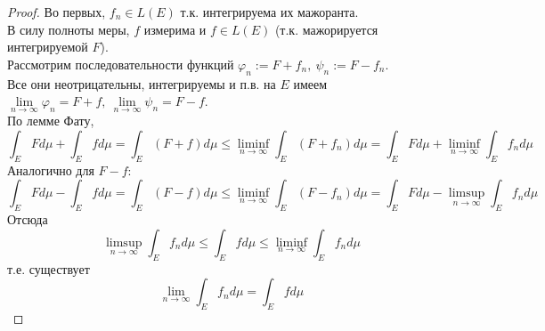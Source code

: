 \documentclass[11pt,a4paper]{report}
\theoremstyle{definition}
\theoremstyle{definition}
\theoremstyle{definition}
\begin{document}
	\begin{proof}
		Во первых, $ f_{n} \in L(E) $ т.к. интегрируема их мажоранта.\\
		В силу полноты меры, $ f $ измерима и $ f \in L(E) $ (т.к. мажорируется интегрируемой $ F $).\\
		Рассмотрим последовательности функций $ \varphi_{n} := F + f_{n},\ \psi_{n} := F - f_{n} $.\\
		Все они неотрицательны, интегрируемы и п.в. на $ E $ имеем $ \lim\limits_{n\to\infty} \varphi_{n} = F + f,\ \lim\limits_{n\to\infty} \psi_{n} = F - f $.\\
		По лемме Фату,
		\[  
			\int_{E} F d\mu + \int_{E} f d\mu = \int_{E} (F + f) d\mu \le \liminf\limits_{n\to\infty}\int_{E}(F + f_{n}) d\mu = \int_{E} F d\mu + \liminf\limits_{n\to\infty} \int_{E} f_{n} d\mu 
		\]
		Аналогично для $ F - f $:
		\[  
			\int_{E} F d\mu - \int_{E} f d\mu = \int_{E} (F - f) d\mu \le \liminf\limits_{n\to\infty}\int_{E}(F - f_{n}) d\mu = \int_{E} F d\mu - \limsup\limits_{n\to\infty} \int_{E} f_{n} d\mu 
		\]
		Отсюда
		\[
			\limsup\limits_{n\to\infty} \int_{E} f_{n} d\mu \le \int_{E} f d\mu \le \liminf_{n\to\infty} \int_{E} f_{n} d\mu
		\]
		т.е. существует
		\[
			\lim\limits_{n\to\infty} \int_{E} f_{n} d\mu = \int_{E} f d\mu
		\] 
	\end{proof}
\end{document}
